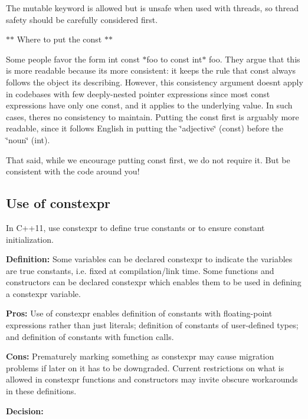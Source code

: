 The {\ttfamily mutable} keyword is allowed but is unsafe when used with threads, so thread safety should be carefully considered first.

$\ast$$\ast$ Where to put the {\ttfamily const} $\ast$$\ast$

Some people favor the form {\ttfamily int const $\ast$foo} to {\ttfamily const int$\ast$ foo}. They argue that this is more readable because it\textquotesingle{}s more consistent\+: it keeps the rule that {\ttfamily const} always follows the object it\textquotesingle{}s describing. However, this consistency argument doesn\textquotesingle{}t apply in codebases with few deeply-\/nested pointer expressions since most {\ttfamily const} expressions have only one {\ttfamily const}, and it applies to the underlying value. In such cases, there\textquotesingle{}s no consistency to maintain. Putting the {\ttfamily const} first is arguably more readable, since it follows English in putting the \char`\"{}adjective\char`\"{} (const) before the \char`\"{}noun\char`\"{} (int).

That said, while we encourage putting {\ttfamily const} first, we do not require it. But be consistent with the code around you!

\subsection*{Use of constexpr}

In C++11, use {\ttfamily constexpr} to define true constants or to ensure constant initialization.

{\bfseries Definition\+:} Some variables can be declared {\ttfamily constexpr} to indicate the variables are true constants, i.\+e. fixed at compilation/link time. Some functions and constructors can be declared constexpr which enables them to be used in defining a constexpr variable.

{\bfseries Pros\+:} Use of {\ttfamily constexpr} enables definition of constants with floating-\/point expressions rather than just literals; definition of constants of user-\/defined types; and definition of constants with function calls.

{\bfseries Cons\+:} Prematurely marking something as constexpr may cause migration problems if later on it has to be downgraded. Current restrictions on what is allowed in constexpr functions and constructors may invite obscure workarounds in these definitions.

{\bfseries Decision\+:}

